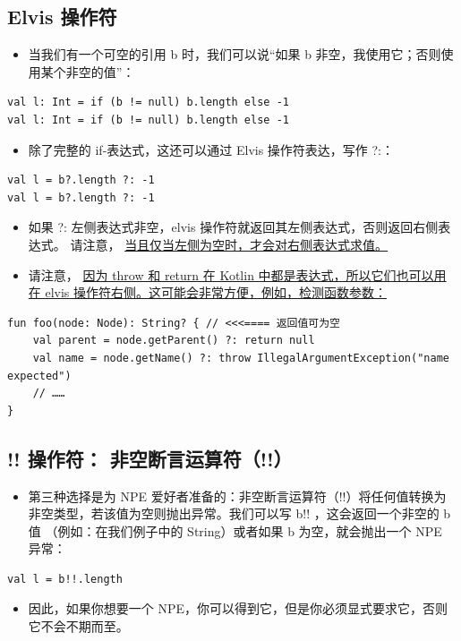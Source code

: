 \documentclass[9pt, b5paper]{article}
\begin{document}
\subsection{Elvis 操作符}
\label{sec-1-4}
\begin{itemize}
\item 当我们有一个可空的引用 b 时，我们可以说“如果 b 非空，我使用它；否则使用某个非空的值”：
\end{itemize}
\begin{verbatim}
val l: Int = if (b != null) b.length else -1
val l: Int = if (b != null) b.length else -1
\end{verbatim}
\begin{itemize}
\item 除了完整的 if-表达式，这还可以通过 Elvis 操作符表达，写作 ?:：
\end{itemize}
\begin{verbatim}
val l = b?.length ?: -1
val l = b?.length ?: -1
\end{verbatim}
\begin{itemize}
\item 如果 ?: 左侧表达式非空，elvis 操作符就返回其左侧表达式，否则返回右侧表达式。 请注意， \uline{当且仅当左侧为空时，才会对右侧表达式求值。}
\item 请注意， \uline{因为 throw 和 return 在 Kotlin 中都是表达式，所以它们也可以用在 elvis 操作符右侧。这可能会非常方便，例如，检测函数参数：}
\end{itemize}
\begin{verbatim}
fun foo(node: Node): String? { // <<<==== 返回值可为空
    val parent = node.getParent() ?: return null
    val name = node.getName() ?: throw IllegalArgumentException("name expected")
    // ……
}
\end{verbatim}

\subsection{!! 操作符： 非空断言运算符（!!）}
\label{sec-1-5}
\begin{itemize}
\item 第三种选择是为 NPE 爱好者准备的：非空断言运算符（!!）将任何值转换为非空类型，若该值为空则抛出异常。我们可以写 b!! ，这会返回一个非空的 b 值 （例如：在我们例子中的 String）或者如果 b 为空，就会抛出一个 NPE 异常：
\end{itemize}
\begin{verbatim}
val l = b!!.length
\end{verbatim}
\begin{itemize}
\item 因此，如果你想要一个 NPE，你可以得到它，但是你必须显式要求它，否则它不会不期而至。
\end{itemize}
\end{document}
